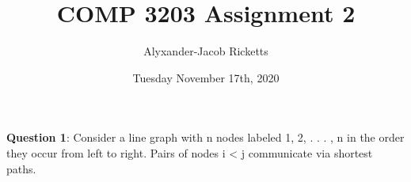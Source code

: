 \documentclass[11pt]{article}
\title{COMP 3203 Assignment 2}
\author{Alyxander-Jacob Ricketts}
\date{Tuesday November 17th, 2020}
\begin{document}
\maketitle

\textbf{Question 1}: Consider a line graph with n nodes labeled 1, 2, . . . , n in the order they occur from left to right. Pairs of nodes i < j communicate via shortest paths.
\end{document}
